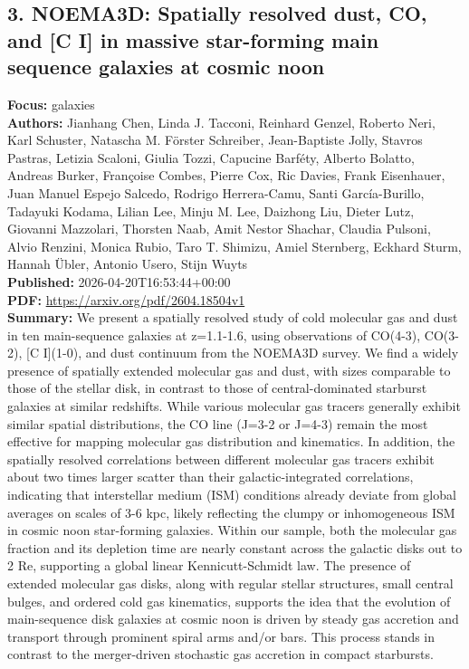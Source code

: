 \documentclass[11pt]{article}
\begin{document}
\subsection*{3. NOEMA3D: Spatially resolved dust, CO, and [C I] in massive star-forming main sequence galaxies at cosmic noon}
\textbf{Focus:} galaxies\\
\textbf{Authors:} Jianhang Chen, Linda J. Tacconi, Reinhard Genzel, Roberto Neri, Karl Schuster, Natascha M. Förster Schreiber, Jean-Baptiste Jolly, Stavros Pastras, Letizia Scaloni, Giulia Tozzi, Capucine Barféty, Alberto Bolatto, Andreas Burker, Françoise Combes, Pierre Cox, Ric Davies, Frank Eisenhauer, Juan Manuel Espejo Salcedo, Rodrigo Herrera-Camu, Santi García-Burillo, Tadayuki Kodama, Lilian Lee, Minju M. Lee, Daizhong Liu, Dieter Lutz, Giovanni Mazzolari, Thorsten Naab, Amit Nestor Shachar, Claudia Pulsoni, Alvio Renzini, Monica Rubio, Taro T. Shimizu, Amiel Sternberg, Eckhard Sturm, Hannah Übler, Antonio Usero, Stijn Wuyts\\
\textbf{Published:} 2026-04-20T16:53:44+00:00\\
\textbf{PDF:} \href{https://arxiv.org/pdf/2604.18504v1}{https://arxiv.org/pdf/2604.18504v1}\\
\textbf{Summary:}
We present a spatially resolved study of cold molecular gas and dust in ten main-sequence galaxies at z=1.1-1.6, using observations of CO(4-3), CO(3-2), [C I](1-0), and dust continuum from the NOEMA3D survey. We find a widely presence of spatially extended molecular gas and dust, with sizes comparable to those of the stellar disk, in contrast to those of central-dominated starburst galaxies at similar redshifts. While various molecular gas tracers generally exhibit similar spatial distributions, the CO line (J=3-2 or J=4-3) remain the most effective for mapping molecular gas distribution and kinematics. In addition, the spatially resolved correlations between different molecular gas tracers exhibit about two times larger scatter than their galactic-integrated correlations, indicating that interstellar medium (ISM) conditions already deviate from global averages on scales of 3-6 kpc, likely reflecting the clumpy or inhomogeneous ISM in cosmic noon star-forming galaxies. Within our sample, both the molecular gas fraction and its depletion time are nearly constant across the galactic disks out to 2 Re, supporting a global linear Kennicutt-Schmidt law. The presence of extended molecular gas disks, along with regular stellar structures, small central bulges, and ordered cold gas kinematics, supports the idea that the evolution of main-sequence disk galaxies at cosmic noon is driven by steady gas accretion and transport through prominent spiral arms and/or bars. This process stands in contrast to the merger-driven stochastic gas accretion in compact starbursts.
\end{document}
